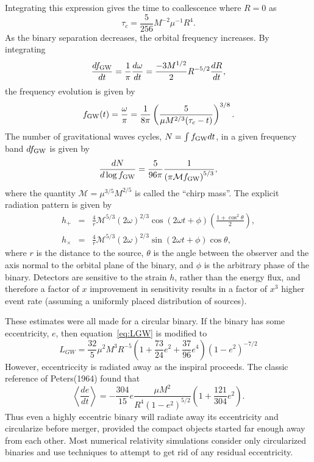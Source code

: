 Integrating this expression gives the time to coallescence where $R=0$ as
\begin{equation}
\tau_{c}=\frac{5}{256}M^{-2}\mu^{-1}R^{4}.
\end{equation}
As the binary separation decreases, the orbital frequency increases. By integrating
\begin{equation}
\frac{df_{\rm{GW}}}{dt}=\frac{1}{\pi}\frac{d\omega}{dt}=\frac{-3M^{1/2}}{2}R^{-5/2}\frac{dR}{dt},
\end{equation}
the frequency evolution is given by
\begin{equation}
f_{\rm{GW}}(t) = \frac{\omega}{\pi}=\frac{1}{8\pi}\left(\frac{5}{\mu M^{2/3}(\tau_{c}-t)}\right)^{3/8}.
\end{equation}
The number of gravitational waves cycles, $N=\int{f_{\rm{GW}}dt}$, in a given frequency band $df_{\rm{GW}}$ is given by
\begin{equation}
\frac{dN}{d\log{f_{\rm{GW}}}}=\frac{5}{96\pi}\frac{1}{\left(\pi\mathcal{M}f_{\rm{GW}}\right)^{5/3}},
\end{equation}
where the quantity $\mathcal{M}=\mu^{3/5}M^{2/5}$ is called the ``chirp mass''. The explicit radiation pattern is given by
\begin{eqnarray}
h_{+} &=& \frac{4}{r}\mathcal{M}^{5/3}(2\omega)^{2/3}\cos(2\omega t+\phi)\left(\frac{1+\cos^2\theta}{2}\right), \\
h_{\times} &=& \frac{4}{r}\mathcal{M}^{5/3}(2\omega)^{2/3}\sin(2\omega t +\phi)\cos\theta,
\end{eqnarray}
where $r$ is the distance to the source, $\theta$ is the angle between the observer and the axis normal to the orbital plane of the binary, and $\phi$ is the arbitrary phase of the binary. Detectors are sensitive to the strain $h$, rather than the energy flux, and therefore a factor of $x$ improvement in sensitivity results in a factor of $x^3$ higher event rate (assuming a uniformly placed distribution of sources).

These estimates were all made for a circular binary. If the binary has some eccentricity, $e$, then equation~\ref{eq:LGW} is modified to
\begin{equation}
L_{GW}=\frac{32}{5}\mu^2M^3R^{-5}\left(1+\frac{73}{24}e^2+\frac{37}{96}e^4\right)\left(1-e^2\right)^{-7/2}
\end{equation}
However, eccentriccity is radiated away as the inspiral proceeds. The classic reference of Peters(1964) found that
\begin{equation}
\left<\frac{de}{dt}\right>=-\frac{304}{15}e\frac{\mu M^2}{R^4\left(1-e^2\right)^{5/2}}\left(1+\frac{121}{304}e^2\right).
\end{equation}
Thus even a highly eccentric binary will radiate away its eccentricity and circularize before merger, provided the compact objects started far enough away from each other. Most numerical relativity simulations consider only circularized binaries and use techniques to attempt to get rid of any residual eccentricity.

